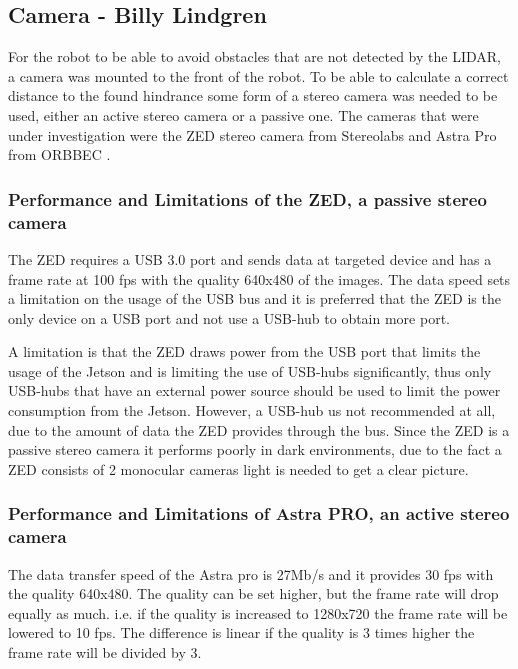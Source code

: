 \subsection{Camera - Billy Lindgren}

\medskip

\noindent

For the robot to be able to avoid obstacles that are not detected by the LIDAR, a camera was mounted to the front of the robot. To be able to calculate a correct distance to the found hindrance some form of a stereo camera was needed to be used, either an active stereo camera or a passive one. The cameras that were under investigation were the ZED stereo camera from Stereolabs \cite{ZEDcamera} and Astra Pro from ORBBEC \cite{AstraPro}.

\subsubsection{Performance and Limitations of the ZED, a passive stereo camera}
\noindent
The ZED requires a USB 3.0 port and sends data at targeted device and has a frame rate at 100 fps with the quality 640x480 of the images. The data speed sets a limitation on the usage of the USB bus and it is preferred that the ZED is the only device on a USB port and not use a USB-hub to obtain more port.

A limitation is that the ZED draws power from the USB port that limits the usage of the Jetson and is limiting the use of USB-hubs significantly, thus only USB-hubs that have an external power source should be used to limit the power consumption from the Jetson. However, a USB-hub us not recommended at all, due to the amount of data the ZED provides through the bus. Since the ZED is a passive stereo camera it performs poorly in dark environments, due to the fact a ZED consists of 2 monocular cameras light is needed to get a clear picture.

\subsubsection{Performance and Limitations of Astra PRO, an active stereo camera}
\noindent
The data transfer speed of the Astra pro is 27Mb/s and it provides 30 fps with the quality 640x480. The quality can be set higher, but the frame rate will drop equally as much. i.e. if the quality is increased to 1280x720 the frame rate will be lowered to 10 fps. The difference is linear if the quality is 3 times higher the frame rate will be divided by 3.
 
